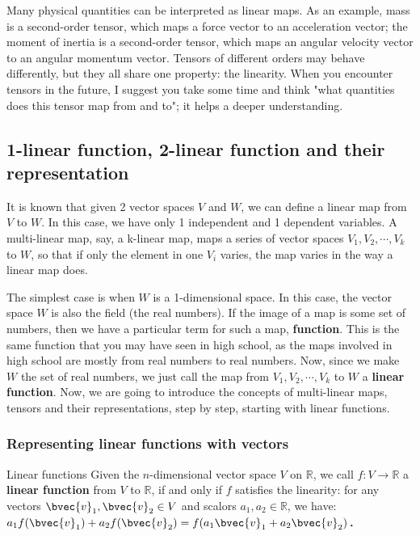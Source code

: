 Many physical quantities can be interpreted as linear maps. As an example, mass is a second-order tensor, which maps a force vector to an acceleration vector; the moment of inertia is a second-order tensor, which maps an angular velocity vector to an angular momentum vector. Tensors of different orders may behave differently, but they all share one property: the linearity. When you encounter tensors in the future, I suggest you take some time and think "what quantities does this tensor map from and to"; it helps a deeper understanding. 



\subsection{1-linear function, 2-linear function and their representation}

It is known that given 2 vector spaces $V$ and $W$, we can define a linear map from $V$ to $W$. In this case, we have only 1 independent and 1 dependent variables. A multi-linear map, say, a k-linear map, maps a series of vector spaces $V_1, V_2, \cdots, V_k$ to $W$, so that if only the element in one $V_i$ varies, the map varies in the way a linear map does. 

The simplest case is when $W$ is a 1-dimensional space. In this case, the vector space $W$ is also the field (the real numbers). If the image of a map is some set of numbers, then we have a particular term for such a map, \textbf{function}. This is the same function that you may have seen in high school, as the maps involved in high school are mostly from real numbers to real numbers. Now, since we make $W$ the set of real numbers, we just call the map from $V_1, V_2, \cdots, V_k$ to $W$ a \textbf{linear function}. Now, we are going to introduce the concepts of multi-linear maps, tensors and their representations, step by step, starting with linear functions. 

\subsubsection{Representing linear functions with vectors}

\begin{definition}{Linear functions}
Given the $n$-dimensional vector space $V$ on $\mathbb{R}$, we call $f:V\rightarrow \mathbb{R}$ a \textbf{linear function} from $V$ to $\mathbb{R}$, if and only if $f$ satisfies the linearity: for any vectors $\bvec{v}_1, \bvec{v}_2\in V$ and scalors $a_1, a_2\in\mathbb{R}$, we have: $a_1f(\bvec{v}_1)+a_2f(\bvec{v}_2)=f(a_1\bvec{v}_1+a_2\bvec{v}_2)$．

\end{definition}


